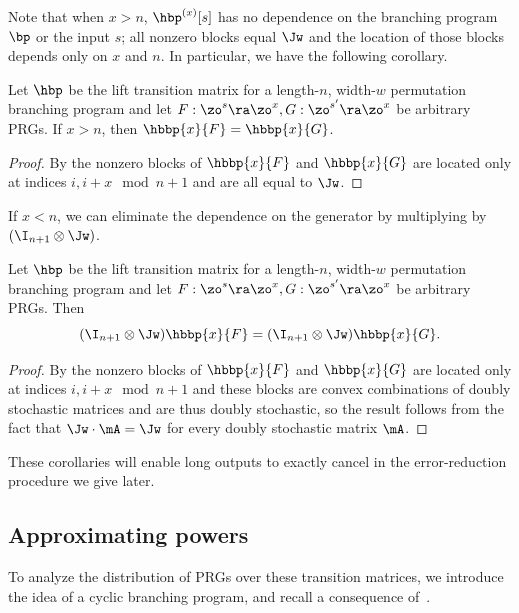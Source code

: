 Note that when $x>n$, $\hbp^{(x)}[s]$ has no dependence on the branching program $\bp$ or the input $s$; all nonzero blocks equal $\Jw$ and the location of those blocks depends only on $x$ and $n$. In particular, we %
have the following corollary.  %
\begin{corollary}\label{cor:longPRGtriv}
Let $\hbp$ be the lift transition matrix for a length-$n$, width-$w$ permutation branching program and let $F:\zo^s\ra\zo^x,G:\zo^{s'}\ra\zo^x$ be arbitrary PRGs. If $x>n$, then $\hbbp{x}{F}=\hbbp{x}{G}$.
\end{corollary}
\begin{proof}
By  the nonzero blocks of $\hbbp{x}{F}$ and $\hbbp{x}{G}$ are located only at indices $i,i+x \mod n+1$ and are all equal to $\Jw$.
\end{proof}
If $x<n$, we can eliminate the dependence on the generator by multiplying by $(\I_{n+1}\otimes \Jw)$.
\begin{corollary}\label{cor:hbpCommutes}
Let $\hbp$ be the lift transition matrix for a length-$n$, width-$w$ permutation branching program and let $F:\zo^s\ra\zo^x,G:\zo^{s'}\ra\zo^x$ be arbitrary PRGs. Then
\[(\I_{n+1}\otimes \Jw)\hbbp{x}{F}=(\I_{n+1}\otimes \Jw)\hbbp{x}{G}.\]
\end{corollary}
\begin{proof}
By  the nonzero blocks of $\hbbp{x}{F}$ and $\hbbp{x}{G}$ are located only at indices $i,i+x \mod n+1$ and these blocks are convex combinations of doubly stochastic matrices and are thus doubly stochastic, so the result follows from the fact that $\Jw\cdot\mA=\Jw$ for every doubly stochastic matrix $\mA$.
\end{proof}
These corollaries will enable long outputs to exactly cancel in the error-reduction procedure we give later.

\subsection{Approximating powers}
To analyze the distribution of PRGs over these transition matrices, we introduce the idea of a cyclic branching program, and recall a consequence of~\cite{HozaPyVa21}.
    
